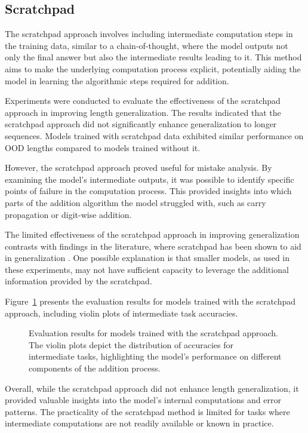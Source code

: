 \subsection{Scratchpad}

The scratchpad approach involves including intermediate computation steps in the training data, similar to a chain-of-thought, where the model outputs not only the final answer but also the intermediate results leading to it. This method aims to make the underlying computation process explicit, potentially aiding the model in learning the algorithmic steps required for addition.

Experiments were conducted to evaluate the effectiveness of the scratchpad approach in improving length generalization. The results indicated that the scratchpad approach did not significantly enhance generalization to longer sequences. Models trained with scratchpad data exhibited similar performance on OOD lengths compared to models trained without it.

However, the scratchpad approach proved useful for mistake analysis. By examining the model's intermediate outputs, it was possible to identify specific points of failure in the computation process. This provided insights into which parts of the addition algorithm the model struggled with, such as carry propagation or digit-wise addition.

The limited effectiveness of the scratchpad approach in improving generalization contrasts with findings in the literature, where scratchpad has been shown to aid in generalization \parencite{lee_teaching_2023}. One possible explanation is that smaller models, as used in these experiments, may not have sufficient capacity to leverage the additional information provided by the scratchpad.

Figure~\ref{fig:scratchpad_eval} presents the evaluation results for models trained with the scratchpad approach, including violin plots of intermediate task accuracies.

\begin{figure}[h!]
    \centering
    \caption{Evaluation results for models trained with the scratchpad approach. The violin plots depict the distribution of accuracies for intermediate tasks, highlighting the model's performance on different components of the addition process.}
    \label{fig:scratchpad_eval}
\end{figure}

Overall, while the scratchpad approach did not enhance length generalization, it provided valuable insights into the model's internal computations and error patterns. The practicality of the scratchpad method is limited for tasks where intermediate computations are not readily available or known in practice.

